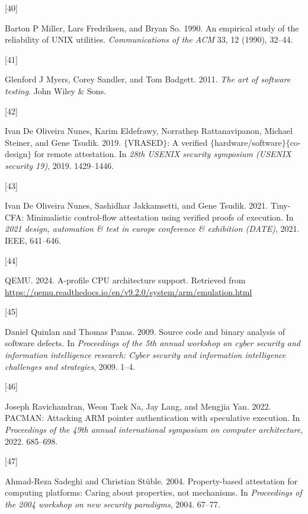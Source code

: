 \documentclass[a4paper, nobind]{templates/ociamthesis}
\newlength{\cslhangindent}
\newlength{\csllabelwidth}
\newenvironment{CSLReferences}[2] %
{\begin{list}{}{%
	\setlength{\itemindent}{0pt}
	\setlength{\leftmargin}{0pt}
	\setlength{\parsep}{0pt}
	\ifodd #1
	\setlength{\leftmargin}{\cslhangindent}
	\setlength{\itemindent}{-1\cslhangindent}
	\fi
	\setlength{\itemsep}{#2\baselineskip}}}
{\end{list}}
\newcommand{\CSLLeftMargin}[1]{\parbox[t]{\csllabelwidth}{\strut#1\strut}}
\newcommand{\CSLRightInline}[1]{\parbox[t]{\linewidth - \csllabelwidth}{\strut#1\strut}}
\begin{document}
\begin{CSLReferences}{0}{0}
\CSLLeftMargin{{[}40{]} }%
\CSLRightInline{Barton P Miller, Lars Fredriksen, and Bryan So. 1990. An empirical study of the reliability of UNIX utilities. \emph{Communications of the ACM} 33, 12 (1990), 32--44.}

\CSLLeftMargin{{[}41{]} }%
\CSLRightInline{Glenford J Myers, Corey Sandler, and Tom Badgett. 2011. \emph{The art of software testing}. John Wiley \& Sons.}

\CSLLeftMargin{{[}42{]} }%
\CSLRightInline{Ivan De Oliveira Nunes, Karim Eldefrawy, Norrathep Rattanavipanon, Michael Steiner, and Gene Tsudik. 2019. \(\{\)VRASED\(\}\): A verified \(\{\)hardware/software\(\}\)\(\{\)co-design\(\}\) for remote attestation. In \emph{28th USENIX security symposium (USENIX security 19)}, 2019. 1429--1446.}

\CSLLeftMargin{{[}43{]} }%
\CSLRightInline{Ivan De Oliveira Nunes, Sashidhar Jakkamsetti, and Gene Tsudik. 2021. Tiny-CFA: Minimalistic control-flow attestation using verified proofs of execution. In \emph{2021 design, automation \& test in europe conference \& exhibition (DATE)}, 2021. IEEE, 641--646.}

\CSLLeftMargin{{[}44{]} }%
\CSLRightInline{QEMU. 2024. A-profile CPU architecture support. Retrieved from \url{https://qemu.readthedocs.io/en/v9.2.0/system/arm/emulation.html}}

\CSLLeftMargin{{[}45{]} }%
\CSLRightInline{Daniel Quinlan and Thomas Panas. 2009. Source code and binary analysis of software defects. In \emph{Proceedings of the 5th annual workshop on cyber security and information intelligence research: Cyber security and information intelligence challenges and strategies}, 2009. 1--4.}

\CSLLeftMargin{{[}46{]} }%
\CSLRightInline{Joseph Ravichandran, Weon Taek Na, Jay Lang, and Mengjia Yan. 2022. PACMAN: Attacking ARM pointer authentication with speculative execution. In \emph{Proceedings of the 49th annual international symposium on computer architecture}, 2022. 685--698.}

\CSLLeftMargin{{[}47{]} }%
\CSLRightInline{Ahmad-Reza Sadeghi and Christian Stüble. 2004. Property-based attestation for computing platforms: Caring about properties, not mechanisms. In \emph{Proceedings of the 2004 workshop on new security paradigms}, 2004. 67--77.}


\end{CSLReferences}
\end{document}
